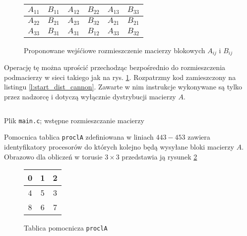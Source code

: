 \begin{figure}[H]
\centering
\begin{tabular}{|cc|cc|cc|}
\hline
\(A_{11}\) & \(B_{11}\) & \(A_{12}\) & \(B_{22}\) & \(A_{13}\) & \(B_{33}\) \\
\hline
\(A_{22}\) & \(B_{21}\) & \(A_{23}\) & \(B_{32}\) & \(A_{21}\) & \(B_{21}\) \\
\hline
\(A_{33}\) & \(B_{31}\) & \(A_{31}\) & \(B_{12}\) & \(A_{33}\) & \(B_{32}\) \\
\hline
\end{tabular}
\caption{Proponowane wejśćiowe rozmieszczenie macierzy blokowych \(A_{ij}\) i \(B_{ij}\)} 
\label{fig:cannon_src2}
\end{figure}

Operację tę można uprościć przechodząc bezpośrednio do rozmieszczenia podmacierzy w sieci takiego jak na rys. \ref{fig:cannon_src2}. Rozpatrzmy kod zamieszczony na listingu \ref{l:start_dist_cannon}. Zawarte w nim instrukcje wykonywane są tylko przez nadzorcę i dotyczą wyłącznie dystrybucji macierzy \(A\).


\begin{listing}[H]
\inputminted[fontsize=\footnotesize,bgcolor=bg,linenos,firstnumber=443,firstline=443,lastline=485]{c}{includes/listings/main.c}
\caption{Plik \texttt{main.c}; wstępne rozmieszczanie macierzy}
\label{l:start_dist_cannon}
\end{listing}

Pomocnica tablica \texttt{proclA} zdefiniowana w liniach \(443-453\) zawiera identyfikatory procesorów do których kolejno będą wysyłane bloki macierzy \(A\). Obrazowo dla obliczeń w torusie \(3\times 3\) przedstawia ją rysunek \ref{fig:proclA}

\begin{figure}[H]
\centering
\begin{tabular}{|c|c|c|}
\hline
0 & 1 & 2 \\
\hline
4 & 5 & 3 \\
\hline
8 & 6 & 7 \\
\hline
\end{tabular}
\caption{Tablica pomocnicza \texttt{proclA}}
\label{fig:proclA}
\end{figure}



